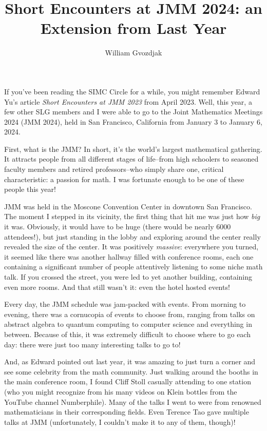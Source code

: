 \documentclass{article}
\title{Short Encounters at JMM 2024: an Extension from Last Year}
\author{William Gvozdjak}
\date{}
\begin{document}
\maketitle

If you've been reading the SIMC Circle for a while, you might remember Edward Yu's article \textit{Short Encounters at JMM 2023} from April 2023. Well, this year, a few other SLG members and I were able to go to the Joint Mathematics Meetings 2024 (JMM 2024), held in San Francisco, California from January 3 to January 6, 2024.

First, what is the JMM? In short, it's the world's largest mathematical gathering. It attracts people from all different stages of life--from high schoolers to seasoned faculty members and retired professors--who simply share one, critical characteristic: a passion for math. I was fortunate enough to be one of these people this year!

JMM was held in the Moscone Convention Center in downtown San Francisco. The moment I stepped in its vicinity, the first thing that hit me was just how \textit{big} it was. Obviously, it would have to be huge (there would be nearly 6000 attendees!), but just standing in the lobby and exploring around the center really revealed the size of the center. It was positively \textit{massive}: everywhere you turned, it seemed like there was another hallway filled with conference rooms, each one containing a significant number of people attentively listening to some niche math talk. If you crossed the street, you were led to yet another building, containing even more rooms. And that still wasn't it: even the hotel hosted events!

Every day, the JMM schedule was jam-packed with events. From morning to evening, there was a cornucopia of events to choose from, ranging from talks on abstract algebra to quantum computing to computer science and everything in between. Because of this, it was extremely difficult to choose where to go each day: there were just too many interesting talks to go to!

And, as Edward pointed out last year, it was amazing to just turn a corner and see some celebrity from the math community. Just walking around the booths in the main conference room, I found Cliff Stoll casually attending to one station (who you might recognize from his many videos on Klein bottles from the YouTube channel Numberphile). Many of the talks I went to were from renowned mathematicians in their corresponding fields. Even Terence Tao gave multiple talks at JMM (unfortunately, I couldn't make it to any of them, though)! 
\end{document}
